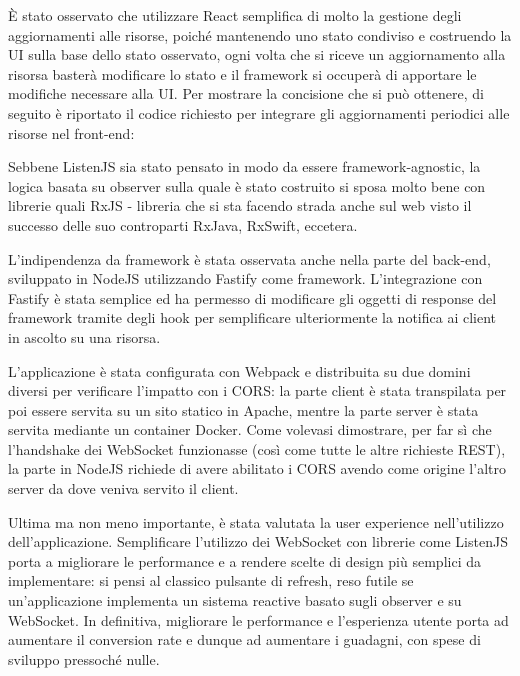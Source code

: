 \documentclass[12pt,a4paper,openright,twoside]{report}
\begin{document}
È stato osservato che utilizzare React semplifica di molto la gestione degli aggiornamenti alle risorse, poiché mantenendo uno stato condiviso e costruendo la UI sulla base dello stato osservato, ogni volta che si riceve un aggiornamento alla risorsa basterà modificare lo stato e il framework si occuperà di apportare le modifiche necessare alla UI. Per mostrare la concisione che si può ottenere, di seguito è riportato il codice richiesto per integrare gli aggiornamenti periodici alle risorse nel front-end:

Sebbene ListenJS sia stato pensato in modo da essere framework-agnostic, la logica basata su observer sulla quale è stato costruito si sposa molto bene con librerie quali RxJS - libreria che si sta facendo strada anche sul web visto il successo delle suo controparti RxJava, RxSwift, eccetera.

\bigskip

L'indipendenza da framework è stata osservata anche nella parte del back-end, sviluppato in NodeJS\cite{nodejs} utilizzando Fastify\cite{fastify} come framework. L'integrazione con Fastify è stata semplice ed ha permesso di modificare gli oggetti di response del framework tramite degli hook per semplificare ulteriormente la notifica ai client in ascolto su una risorsa.


L'applicazione è stata configurata con Webpack\cite{webpack} e distribuita su due domini diversi per verificare l'impatto con i CORS: la parte client è stata transpilata per poi essere servita su un sito statico in Apache, mentre la parte server è stata servita mediante un container Docker. Come volevasi dimostrare, per far sì che l'handshake dei WebSocket funzionasse (così come tutte le altre richieste REST), la parte in NodeJS richiede di avere abilitato i CORS avendo come origine l'altro server da dove veniva servito il client.

\bigskip

Ultima ma non meno importante, è stata valutata la user experience nell'utilizzo dell'applicazione. Semplificare l'utilizzo dei WebSocket con librerie come ListenJS porta a migliorare le performance e a rendere scelte di design più semplici da implementare: si pensi al classico pulsante di refresh, reso futile se un'applicazione implementa un sistema reactive basato sugli observer e su WebSocket. In definitiva, migliorare le performance e l'esperienza utente porta ad aumentare il conversion rate\cite{why_performance_matters} e dunque ad aumentare i guadagni, con spese di sviluppo pressoché nulle.
\end{document}
